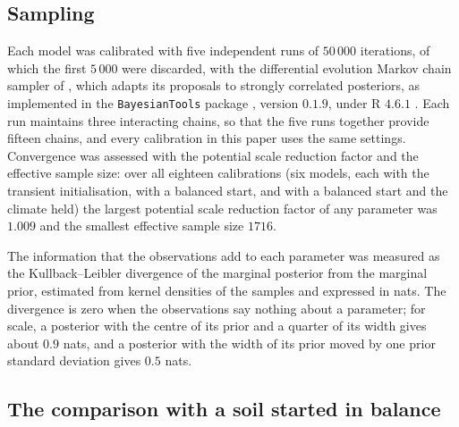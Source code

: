 \documentclass[11pt]{article}
\begin{document}
\subsection{Sampling}\label{sec:sampling}

Each model was calibrated with five independent runs of $50\,000$ iterations, of which the first
$5\,000$ were discarded, with the differential evolution Markov chain sampler of
\citet{terBraakVrugt2008}, which adapts its proposals to strongly correlated posteriors, as
implemented in the \texttt{BayesianTools} package \citep{BayesianTools}, version $0.1.9$, under R
$4.6.1$ \citep{RCore}. Each run maintains three interacting chains, so that the five runs together
provide fifteen chains, and every calibration in this paper uses the same settings. Convergence was
assessed with the potential scale reduction factor and the effective sample size: over all eighteen
calibrations (six models, each with the transient initialisation, with a balanced start, and with a
balanced start and the climate held) the largest potential scale reduction factor of any parameter
was $1.009$ and the smallest effective sample size $1716$.

The information that the observations add to each parameter was measured as the Kullback--Leibler
divergence of the marginal posterior from the marginal prior, estimated from kernel densities of the
samples and expressed in nats. The divergence is zero when the observations say nothing about a
parameter; for scale, a posterior with the centre of its prior and a quarter of its width gives
about $0.9$ nats, and a posterior with the width of its prior moved by one prior standard deviation
gives $0.5$ nats.


\subsection{The comparison with a soil started in balance}\label{sec:balanced}
\end{document}
